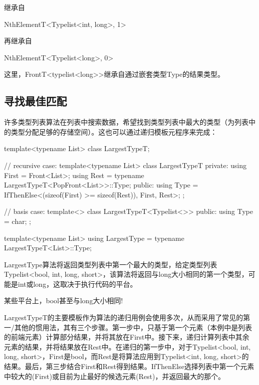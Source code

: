 继承自

\begin{cpp}
NthElementT<Typelist<int, long>, 1>
\end{cpp}

再继承自

\begin{cpp}
NthElementT<Typelist<long>, 0>
\end{cpp}

这里，FrontT<typelist<long>{}>继承自通过嵌套类型Type的结果类型。

\subsection{寻找最佳匹配}

许多类型列表算法在列表中搜索数据，希望找到类型列表中最大的类型（为列表中的类型分配足够的存储空间）。这也可以通过递归模板元程序来完成：

\begin{cpp}
template<typename List>
class LargestTypeT;

// recursive case:
template<typename List>
class LargestTypeT
{
	private:
	using First = Front<List>;
	using Rest = typename LargestTypeT<PopFront<List>>::Type;
	public:
	using Type = IfThenElse<(sizeof(First) >= sizeof(Rest)), First, Rest>;
};

// basis case:
template<>
class LargestTypeT<Typelist<>>
{
	public:
	using Type = char;
};

template<typename List>
using LargestType = typename LargestTypeT<List>::Type;
\end{cpp}

LargestType算法将返回类型列表中第一个最大的类型，给定类型列表Typelist<bool, int, long, short>，该算法将返回与long大小相同的第一个类型，可能是int或long，这取决于执行代码的平台。

\begin{notice}
某些平台上，bool甚至与long大小相同!
\end{notice}

LargestTypeT的主要模板作为算法的递归用例会使用多次，从而采用了常见的第一/其他的惯用法，其有三个步骤。第一步中，只基于第一个元素（本例中是列表的前端元素）计算部分结果，并将其放在First中。接下来，递归计算列表中其余元素的结果，并将结果放在Rest中。在递归的第一步中，对于Typelist<bool, int, long, short>，First是bool，而Rest是将算法应用到Typelist<int, long, short>的结果。最后，第三步结合First和Rest得到结果。IfThenElse选择列表中第一个元素中较大的(First)或目前为止最好的候选元素(Rest)，并返回最大的那个。

